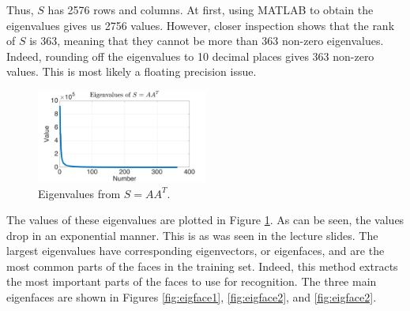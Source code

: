 \documentclass[a4paper, 10pt, conference]{ieeeconf}
\begin{document}
Thus, $S$ has 2576 rows and columns. At first, using MATLAB to obtain the eigenvalues gives us 2756 values. However, closer inspection shows that the rank of $S$ is 363, meaning that they cannot be more than 363 non-zero eigenvalues. Indeed, rounding off the eigenvalues to 10 decimal places gives 363 non-zero values. This is most likely a floating precision issue.

\begin{figure}[h]
    \centering
    \includegraphics[width=0.5\textwidth]{src/S_eig_val_rounded.png}
    \caption{Eigenvalues from $S = AA^T$.}
    \label{fig:S_eig_val}
\end{figure}

The values of these eigenvalues are plotted in Figure \ref{fig:S_eig_val}. As can be seen, the values drop in an exponential manner. This is as was seen in the lecture slides. The largest eigenvalues have corresponding eigenvectors, or eigenfaces, and are the most common parts of the faces in the training set. Indeed, this method extracts the most important parts of the faces to use for recognition. The three main eigenfaces are shown in Figures \ref{fig:eigface1}, \ref{fig:eigface2}, and \ref{fig:eigface2}.
\end{document}
